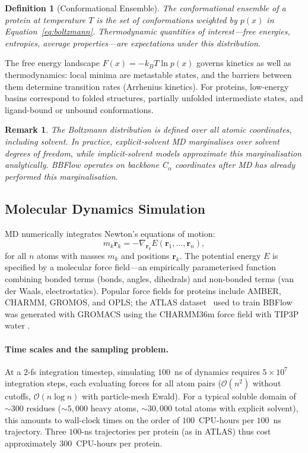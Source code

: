 \documentclass[12pt,a4paper]{article}
\newtheorem{definition}{Definition}[section]
\newtheorem{remark}{Remark}[section]
\begin{document}
\begin{definition}[Conformational Ensemble]
  The \emph{conformational ensemble} of a protein at temperature $T$ is the set of
  conformations weighted by $p(x)$ in Equation~\eqref{eq:boltzmann}.  Thermodynamic
  quantities of interest---free energies, entropies, average properties---are expectations
  under this distribution.
\end{definition}

The free energy landscape $F(x) = -k_B T \ln p(x)$ governs kinetics as well as
thermodynamics: local minima are metastable states, and the barriers between them determine
transition rates (Arrhenius kinetics).  For proteins, low-energy basins correspond to
folded structures, partially unfolded intermediate states, and ligand-bound or unbound conformations.

\begin{remark}
  The Boltzmann distribution is defined over all atomic coordinates, including solvent.  In
  practice, explicit-solvent MD marginalises over solvent degrees of freedom, while
  implicit-solvent models approximate this marginalisation analytically.  BBFlow operates on
  backbone C$_\alpha$ coordinates after MD has already performed this marginalisation.
\end{remark}

\subsection{Molecular Dynamics Simulation}
\label{sec:md}

MD numerically integrates Newton's equations of motion:
\begin{equation}
  \label{eq:newton}
  m_k \ddot{\mathbf{r}}_k = -\nabla_{\mathbf{r}_k} E(\mathbf{r}_1, \ldots, \mathbf{r}_n),
\end{equation}
for all $n$ atoms with masses $m_k$ and positions $\mathbf{r}_k$.  The potential energy $E$
is specified by a molecular force field---an empirically parameterised function combining
bonded terms (bonds, angles, dihedrals) and non-bonded terms (van der Waals, electrostatics).
Popular force fields for proteins include AMBER, CHARMM, GROMOS, and OPLS; the ATLAS
dataset~\citep{vandermeersche2024atlas} used to train BBFlow was generated with GROMACS
\citep{abraham2015gromacs} using the CHARMM36m force field with TIP3P water \citep{jorgensen1983}.

\paragraph{Time scales and the sampling problem.}
At a $2$-fs integration timestep, simulating $100$~ns of dynamics requires $5 \times 10^7$
integration steps, each evaluating forces for all atom pairs ($\mathcal{O}(n^2)$ without cutoffs,
$\mathcal{O}(n \log n)$ with particle-mesh Ewald).  For a typical soluble domain of $\sim 300$
residues ($\sim 5{,}000$ heavy atoms, $\sim 30{,}000$ total atoms with explicit solvent), this
amounts to wall-clock times on the order of $100$~CPU-hours per $100$~ns trajectory.  Three
$100$-ns trajectories per protein (as in ATLAS) thus cost approximately $300$~CPU-hours per
protein.
\end{document}
